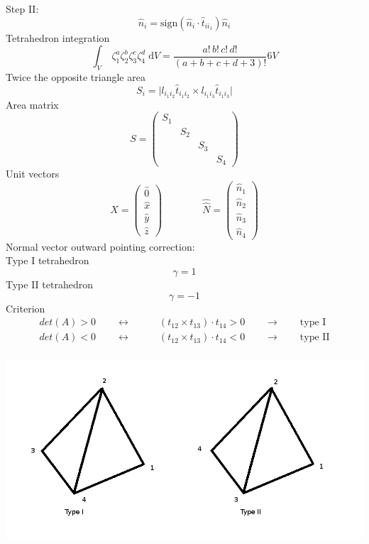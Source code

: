 \documentclass[a4paper,onecolumn]{article}
\begin{document}
Step II:
$$
    \hat{n}_i = \textrm{sign}\left(\hat{n}_i\cdot \hat{t}_{i i_1}\right)\hat{n}_i
$$
Tetrahedron integration
$$
    \int_V\; \zeta_1^a \zeta_2^b \zeta_3^c \zeta_4^d \; \textrm{d}V = \frac{a!\,b!\,c!\,d!}{(a+b+c+d+3)!} 6V
$$
Twice the opposite triangle area
$$
    S_i = \bigl| l_{i_1i_2} \hat{t}_{i_1 i_2} \times l_{i_1 i_3} \hat{t}_{i_1i_3} \bigr|
$$
Area matrix
$$
    S = \begin{pmatrix}S_1 &&&\\&S_2&&\\&&S_3&\\&&&S_4\end{pmatrix}
$$
Unit vectors
$$
    \hat{\hat{X}} = \begin{pmatrix}
        \hat{0}\\\hat{x}\\\hat{y}\\\hat{z}
    \end{pmatrix}\qquad\qquad
    \hat{\hat{N}} = \begin{pmatrix}
        \hat{n}_1\\\hat{n}_2\\\hat{n}_3\\\hat{n}_4
    \end{pmatrix}
$$
Normal vector outward pointing correction:\\
Type I tetrahedron
$$
  \gamma = 1
$$
Type II tetrahedron
$$
  \gamma = -1
$$
Criterion
\begin{equation*}\begin{split}
    det(A) >0 \qquad \leftrightarrow \qquad &\left( t_{12}\times t_{13} \right) \cdot t_{14} >0\qquad\rightarrow \qquad \textrm{type I}\\
    det(A) <0 \qquad \leftrightarrow \qquad &\left( t_{12}\times t_{13} \right) \cdot t_{14} <0\qquad\rightarrow \qquad \textrm{type II}
\end{split}\end{equation*}
\begin{center}
    \includegraphics[height=7cm]{typestetra.png}
\end{center}
\end{document}

